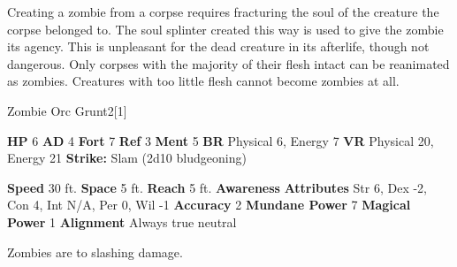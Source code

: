       Creating a zombie from a corpse requires fracturing the soul of the creature the corpse belonged to.
      The soul splinter created this way is used to give the zombie its agency.
      This is unpleasant for the dead creature in its afterlife, though not dangerous.
      Only corpses with the majority of their flesh intact can be reanimated as zombies.
      Creatures with too little flesh cannot become zombies at all.
    

      
  \begin{monsubsection}{Zombie Orc Grunt}{2}[1]
    \vspace{-1em}\vspace{-1em}
    \vspace{0em}

    
    

    \begin{spellcontent}
      \begin{spelltargetinginfo}
        \pari \textbf{HP} 6 \monsep
          \textbf{AD} 4 \monsep
          \textbf{Fort} 7 \monsep
          \textbf{Ref} 3 \monsep
          \textbf{Ment} 5
        \pari \textbf{BR} Physical 6, Energy 7 \monsep
        \textbf{VR} Physical 20, Energy 21
        \pari \textbf{Strike:}
            Slam  (2d10 bludgeoning)
      \end{spelltargetinginfo}
    \end{spellcontent}
    \begin{monsterfooter}
      \pari \textbf{Speed} 30 ft. \monsep
        \textbf{Space} 5 ft. \monsep
        \textbf{Reach} 5 ft.
      \pari \textbf{Awareness} 
      \pari \textbf{Attributes}
        Str 6, Dex -2,
        Con 4, Int N/A,
        Per 0, Wil -1
      \pari \textbf{Accuracy} 2 \monsep
        \textbf{Mundane Power} 7 \monsep
      \textbf{Magical Power} 1
      \pari \textbf{Alignment} Always true neutral
    \end{monsterfooter}
  \end{monsubsection}
          Zombies are  to slashing damage.
  

